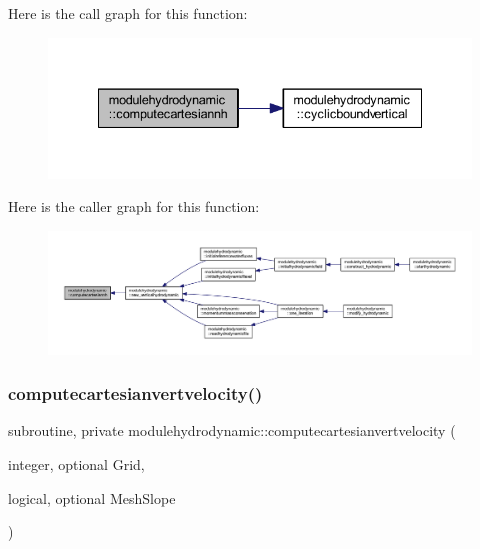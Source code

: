 Here is the call graph for this function\+:\nopagebreak
\begin{figure}[H]
\begin{center}
\leavevmode
\includegraphics[width=335pt]{namespacemodulehydrodynamic_a40e6066d8e63726036522b3dcddee56a_cgraph}
\end{center}
\end{figure}
Here is the caller graph for this function\+:\nopagebreak
\begin{figure}[H]
\begin{center}
\leavevmode
\includegraphics[width=350pt]{namespacemodulehydrodynamic_a40e6066d8e63726036522b3dcddee56a_icgraph}
\end{center}
\end{figure}
\mbox{\label{namespacemodulehydrodynamic_a6063cff17a8575e5ea95e38e9a14da2d}} 
\subsubsection{\texorpdfstring{computecartesianvertvelocity()}{computecartesianvertvelocity()}}
{\footnotesize\ttfamily subroutine, private modulehydrodynamic\+::computecartesianvertvelocity (\begin{DoxyParamCaption}\item[{integer, optional}]{Grid,  }\item[{logical, optional}]{Mesh\+Slope }\end{DoxyParamCaption})\hspace{0.3cm}{\ttfamily [private]}}

